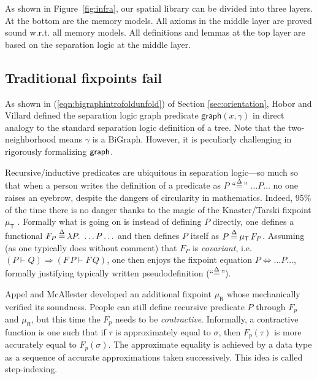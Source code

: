 As shown in Figure~\ref{fig:infra}, our spatial library can be divided
into three layers. At the bottom are the memory models. All axioms in the middle layer are proved sound w.r.t. all memory models.
All definitions and lemmas at the top layer are based on the separation logic at the middle layer.



\subsection{Traditional fixpoints fail}\label{sec:fixpointfail}

As shown in (\ref{eqn:bigraphintrofoldunfold}) of Section
\ref{sec:orientation}, Hobor and Villard\cite{hobor:ramification}
defined the separation logic graph predicate
$\mathsf{graph}(x,\gamma)$ in direct analogy to the standard
separation logic definition of a tree. Note that the two-neighborhood
means $\gamma$ is a BiGraph. However, it is peculiarly challenging in
rigorously formalizing $\mathsf{graph}$.


Recursive/inductive predicates are ubiquitous in separation logic---so
much so that when a person writes the definition of a predicate as $P$
``$\mathbin{\stackrel{\Delta}{=}}$'' $\ldots P \ldots$ no one raises an eyebrow, despite the
dangers of circularity in mathematics. Indeed, 95\% of the time there
is no danger thanks to the magic of the Knaster/Tarski fixpoint
$\mu_{\mathsf{T}}$ \cite{tarski:fixpoint}. Formally what is going on
is instead of defining $P$ directly, one defines a functional $F_P
\mathbin{\stackrel{\Delta}{=}} \lambda P.~ \ldots P \ldots$ and then defines $P$ itself as $P
\mathbin{\stackrel{\Delta}{=}} \mu_{\mathsf{T}} \, F_P$.  Assuming (as one typically does
without comment) that $F_P$ is \emph{covariant}, i.e. $(P \vdash Q)
\Rightarrow (F \, P \vdash F \, Q)$, one then enjoys the fixpoint
equation $P \Leftrightarrow \ldots P \ldots$, formally justifying
typically written pseudodefinition (``$\mathbin{\stackrel{\Delta}{=}}$'').

Appel and McAllester developed an additional fixpoint
$\mu_{\mathsf{R}}$ \cite{appel:fixpoint} whose \cite{appel:vmm}
mechanically verified its soundness. People can still define recursive
predicate $P$ through $F_p$ and $\mu_{\mathsf{R}}$, but this time the
$F_p$ needs to be \emph{contractive}. Informally, a contractive
function is one such that if $\tau$ is approximately equal to
$\sigma$, then $F_p(\tau)$ is more accurately equal to
$F_p(\sigma)$. The approximate equality is achieved by a data type as
a sequence of accurate approximations taken successively. This idea is
called step-indexing.

